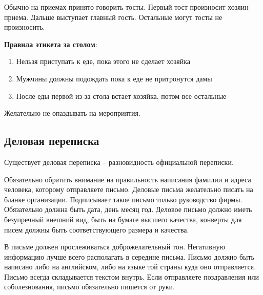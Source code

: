 \documentclass{article}
\begin{document}
Обычно на приемах принято говорить тосты. Первый тост произносит хозяин приема. Дальше выступает главный гость. Остальные могут тосты не произносить.

\textbf{Правила этикета за столом}:

\begin{enumerate}
    \item Нельзя приступать к еде, пока этого не сделает хозяйка
    \item Мужчины должны подождать пока к еде не притронутся дамы
    \item После еды первой из-за стола встает хозяйка, потом все остальные
\end{enumerate}

Желательно не опаздывать на мероприятия.

\subsection{Деловая переписка}

Существует деловая переписка – разновидность официальной переписки.

Обязательно обратить внимание на правильность написания фамилии и
адреса человека, которому отправляете письмо. Деловые письма желательно писать на бланке организации. Подписывает такое письмо только руководство фирмы. Обязательно должна быть дата, день месяц год. Деловое письмо должно иметь безупречный внешний вид, быть на бумаге высшего качества, конверты для писем должны быть соответствующего размера и качества.

В письме должен прослеживаться доброжелательный тон. Негативную информацию лучше всего располагать в середине письма. Письмо должно быть написано либо на английском, либо на языке той страны куда оно отправляется. Письмо всегда складывается текстом внутрь. Если отправляете поздравления или соболезнования, письмо обязательно пишется от руки.
\end{document}
